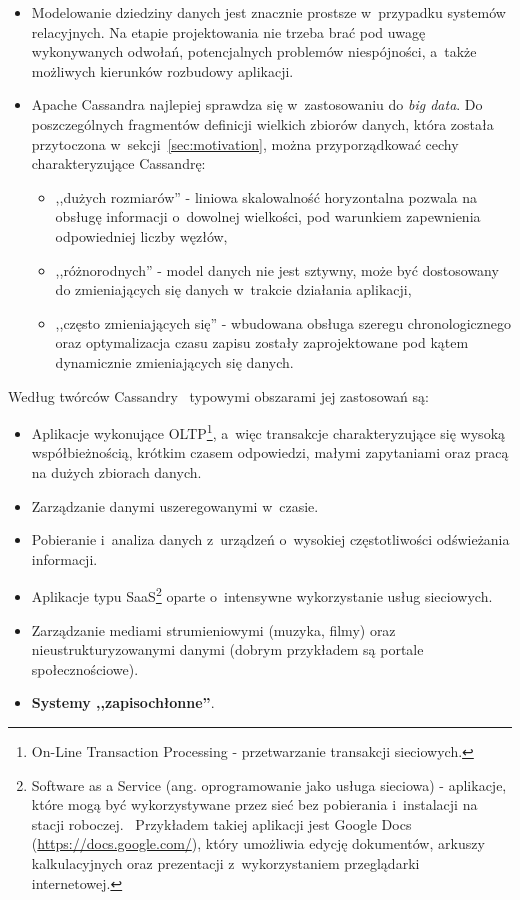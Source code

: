 \begin{itemize}
	\item Modelowanie dziedziny danych jest znacznie prostsze w~przypadku systemów relacyjnych. Na etapie projektowania nie trzeba brać pod uwagę wykonywanych odwołań, potencjalnych problemów niespójności, a~także możliwych kierunków rozbudowy aplikacji.
	\item Apache Cassandra najlepiej sprawdza się w~zastosowaniu do \emph{big data}. Do poszczególnych fragmentów definicji wielkich zbiorów danych, która została przytoczona w~sekcji~\ref{sec:motivation}, można przyporządkować cechy charakteryzujące Cassandrę:
		\begin{itemize}
			\item ,,dużych rozmiarów'' - liniowa skalowalność horyzontalna pozwala na obsługę informacji o~dowolnej wielkości, pod warunkiem zapewnienia odpowiedniej liczby węzłów,
			\item ,,różnorodnych'' - model danych nie jest sztywny, może być dostosowany do zmieniających się danych w~trakcie działania aplikacji,
			\item ,,często zmieniających się'' - wbudowana obsługa szeregu chronologicznego oraz optymalizacja czasu zapisu zostały zaprojektowane pod kątem dynamicznie zmieniających się danych. 
		\end{itemize}
\end{itemize}

\noindent Według twórców Cassandry~\cite{why_migrate_from_mysql} typowymi obszarami jej zastosowań są:

\begin{itemize}
	\item Aplikacje wykonujące OLTP\footnote{On-Line Transaction Processing - przetwarzanie transakcji sieciowych.}, a~więc transakcje charakteryzujące się wysoką współbieżnością, krótkim czasem odpowiedzi, małymi zapytaniami oraz pracą na dużych zbiorach danych.~\cite{oltp_definition}
	\item Zarządzanie danymi uszeregowanymi w~czasie.
	\item Pobieranie i~analiza danych z~urządzeń o~wysokiej częstotliwości odświeżania informacji.
	\item Aplikacje typu SaaS\footnote{Software as a Service (ang. oprogramowanie jako usługa sieciowa) - aplikacje, które mogą być wykorzystywane przez sieć bez pobierania i~instalacji na stacji roboczej.~\cite{saas_definition} Przykładem takiej aplikacji jest Google Docs (\url{https://docs.google.com/}), który umożliwia edycję dokumentów, arkuszy kalkulacyjnych oraz prezentacji z~wykorzystaniem przeglądarki internetowej.} oparte o~intensywne wykorzystanie usług sieciowych.
	\item Zarządzanie mediami strumieniowymi (muzyka, filmy) oraz nieustrukturyzowanymi danymi (dobrym przykładem są portale społecznościowe).
	\item \textbf{Systemy ,,zapisochłonne''}.
\end{itemize}

